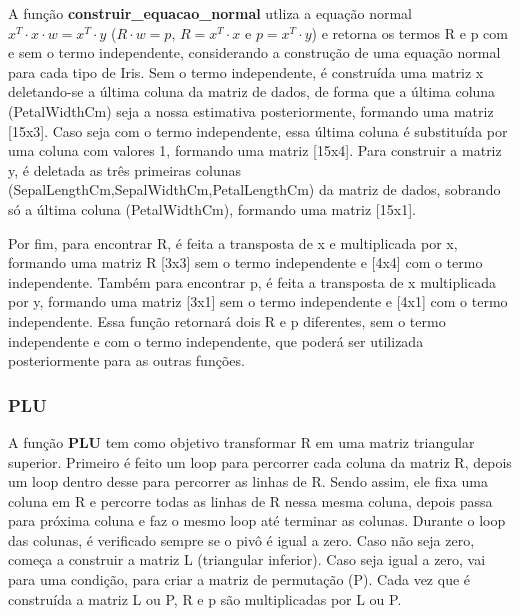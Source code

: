 \documentclass[a4paper,12pt,twoside]{article}
\begin{document}
   A função \textbf{construir\_equacao\_normal} utliza a equação normal $x^{T}\cdot x\cdot w=x^{T}\cdot y$ ($R\cdot w=p$, $R=x^{T}\cdot x$ e $p = x^{T}\cdot y$) e retorna os termos R e p com e sem o termo independente, considerando a construção de uma equação normal para cada tipo de Iris. Sem o termo independente, é construída uma matriz x deletando-se a última coluna da matriz de dados, de forma que a última coluna (PetalWidthCm) seja a nossa estimativa posteriormente, formando uma matriz [15x3]. Caso seja com o termo independente, essa última coluna é substituída por uma coluna com valores 1, formando uma matriz [15x4]. Para construir a matriz y, é deletada as três primeiras colunas (SepalLengthCm,SepalWidthCm,PetalLengthCm) da matriz de dados, sobrando só a última coluna (PetalWidthCm), formando uma matriz [15x1]. 
   
   Por fim, para encontrar R, é feita a transposta de x e multiplicada por x, formando uma matriz R [3x3] sem o termo independente e [4x4] com o termo independente. Também para encontrar p, é feita a transposta de x multiplicada por y, formando uma matriz [3x1] sem o termo independente e [4x1] com o termo independente. Essa função retornará dois R e p diferentes, sem o termo independente e com o termo independente, que poderá ser utilizada posteriormente para as outras funções.
\subsubsection{PLU}
A função \textbf{PLU} tem como objetivo transformar R em uma matriz triangular superior. Primeiro é feito um loop para percorrer cada coluna da matriz R, depois um loop dentro desse para percorrer as linhas de R. Sendo assim, ele fixa uma coluna em R e percorre todas as linhas de R nessa mesma coluna, depois passa para próxima coluna e faz o mesmo loop até terminar as colunas. Durante o loop das colunas, é verificado sempre se o pivô é igual a zero. Caso não seja zero, começa a construir a matriz L (triangular inferior). Caso seja igual a zero, vai para uma condição, para criar a matriz de permutação (P). Cada vez que é construída a matriz L ou P, R e p são multiplicadas por L ou P.
\end{document}
